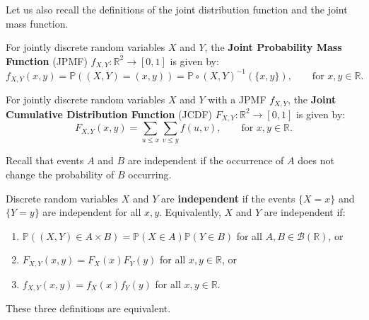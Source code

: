 \documentclass{huhtakm-template-book-v2}
\newcommand{\prob}{\mathbb{P}}
\begin{document}
    Let us also recall the definitions of the joint distribution function and the joint mass function.
    \begin{defn}
        For jointly discrete random variables $X$ and $Y$, the \textbf{Joint Probability Mass Function} (JPMF) $f_{X,Y}:\mathbb{R}^{2} \to [0,1]$ is given by:
        \begin{equation*}
            f_{X,Y}(x, y) = \prob((X,Y) = (x, y)) = \prob \circ (X,Y)^{-1}(\{x,y\}), \qquad\text{for }x,y \in \mathbb{R}.
        \end{equation*}
    \end{defn}
    \begin{defn}
        For jointly discrete random variables $X$ and $Y$ with a JPMF $f_{X,Y}$, the \textbf{Joint Cumulative Distribution Function} (JCDF) $F_{X,Y}:\mathbb{R}^{2} \to [0,1]$ is given by:
        \begin{equation*}
            F_{X,Y}(x, y) = \sum_{u \leq x}\sum_{v \leq y}f(u, v), \qquad \text{for }x,y \in \mathbb{R}.
        \end{equation*}
    \end{defn}
    Recall that events $A$ and $B$ are independent if the occurrence of $A$ does not change the probability of $B$ occurring.
    \begin{defn}
        Discrete random variables $X$ and $Y$ are \textbf{independent} if the events $\{X = x\}$ and $\{Y = y\}$ are independent for all $x,y$. Equivalently, $X$ and $Y$ are independent if:
        \begin{enumerate}
            \item $\prob((X,Y) \in A\times B) = \prob(X \in A)\prob(Y \in B)$ for all $A,B \in \mathcal{B}(\mathbb{R})$, or
            \item $F_{X,Y}(x, y) = F_{X}(x)F_{Y}(y)$ for all $x,y \in \mathbb{R}$, or
            \item $f_{X,Y}(x, y) = f_{X}(x)f_{Y}(y)$ for all $x,y \in \mathbb{R}$.
        \end{enumerate}
    \end{defn}
    \begin{cla}
        These three definitions are equivalent.
    \end{cla}
\end{document}

